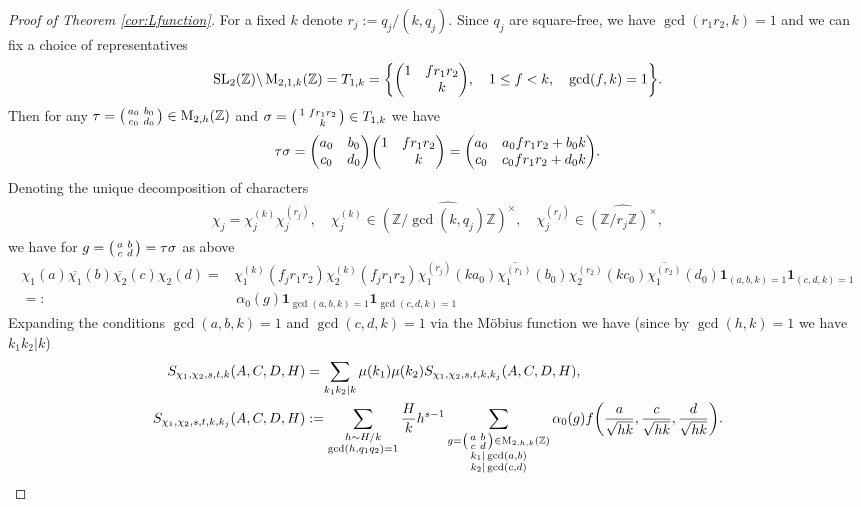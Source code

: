 \documentclass[12pt]{amsart}
\theoremstyle{definition}
\theoremstyle{remark}
\numberwithin{equation}{section}
\newcommand{\Z}{{\mathbb Z}}
\newcommand{\1}{{\mathbf 1}}
\newcommand{\SL}{\operatorname{SL}_2}
\newcommand{\MM}{\operatorname{M}}
\begin{document}
\begin{proof}[Proof of Theorem \ref{cor:Lfunction}]
For a fixed $k$ denote $r_j := q_j/(k,q_j)$. Since $q_j$ are square-free, we have $\gcd(r_1r_2,k)=1$ and we can fix a choice of representatives
\begin{align*}
    \SL(\Z) \backslash \MM_{2,1,k}(\Z) =T_{1,k} =\bigg\{ \mqty(1 & f r_1r_2 \\ & k), \quad 1\leq f < k, \quad \gcd(f,k)=1\bigg\}.
\end{align*}
Then for any $\tau= \smqty(a_0 & b_0 \\ c_0 & d_0) \in \MM_{2,h}(\Z)$ and $\sigma=\smqty(1 & f r_1r_2 \\ & k) \in T_{1,k}$ we have
\begin{align} \label{eq:tausigmadef}
     \tau \sigma =   \mqty(a_0 & b_0 \\ c_0 & d_0) \mqty(1 & f r_1r_2 \\ & k) =  \mqty(a_0 & a_0f r_1r_2+ b_0k \\ c_0 & c_0 f r_1r_2 + d_0k). 
\end{align}
Denoting the unique decomposition of characters
\begin{align*}
    \chi_j = \chi^{(k)}_{j} \chi_{j}^{(r_j)}, \quad \chi^{(k)}_{j} \in \widehat{(\Z/\gcd(k,q_j)\Z)^\times}, \quad\chi_{j}^{(r_j)} \in \widehat{(\Z/r_j\Z)^\times},
\end{align*}
we have for $g = \smqty(a & b \\ c& d) = \tau \sigma$ as above
\begin{align*}
    \chi_1(a)\overline{\chi_1}(b)\overline{\chi_2}(c) \chi_2(d)  = & \chi^{(k)}_{1} (f_j r_1 r_2) \chi^{(k)}_{2} (f_j r_1 r_2)   \chi_{1}^{(r_j)}(k a_0) \overline{\chi_{1}^{(r_1)}}(b_0) \chi_{2}^{(r_2)}(k c_0) \overline{\chi_{1}^{(r_2)}}(d_0) \mathbf{1}_{(a,b,k)=1} \mathbf{1}_{(c,d,k)=1} \\
    =: & \, \alpha_0(g) \mathbf{1}_{\gcd(a,b,k)=1} \mathbf{1}_{\gcd(c,d,k)=1}
\end{align*}
Expanding the conditions $\gcd(a,b,k)=1$ and $\gcd(c,d,k)=1$ via the M\"obius function we have (since by $\gcd(h,k)=1$ we have $k_1k_2 |k$)
\begin{align*}
 S_{\chi_1,\chi_2,s,t,k}(A,C,D,H) &= \sum_{k_1k_2 | k} \mu(k_1) \mu(k_2)  S_{\chi_1,\chi_2,s,t,k,k_j}(A,C,D,H), \\
 S_{\chi_1,\chi_2,s,t,k,k_j}(A,C,D,H) &:=  \sum_{\substack{h \sim H/k \\ \gcd(h,q_1q_2)=1}} \frac{H}{k} h^{s-1}\sum_{\substack{g=\smqty(a& b \\ c & d)\in \MM_{2,h,k}(\Z) \\ k_1|\gcd(a,b) \\ k_2 | \gcd(c,d)}} \alpha_0(g) f\bigg(\frac{a}{\sqrt{hk}},\frac{c}{\sqrt{hk}},\frac{d}{\sqrt{hk}}\bigg).

\end{align*}
\end{proof}
\end{document}
